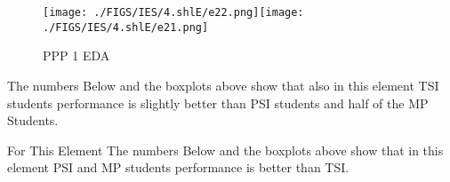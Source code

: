 \documentclass[12pt]{extreport}
\begin{document}
\begin{figure}[H]
	\centering
	\texttt{[image: ./FIGS/IES/4.shlE/e22.png]}\texttt{[image: ./FIGS/IES/4.shlE/e21.png]}
	\caption{PPP 1 EDA}
	\label{fig:45}
\end{figure}
The numbers Below and the boxplots above show that also in this element  TSI students performance is slightly better than PSI students and half of the MP Students.

For This Element The numbers Below and the boxplots above show that in this element  PSI and MP students performance is  better than TSI.


\begin{comment}

\subparagraph{Interpretation of the Box-plots:}
For This Element 

\begin{enumerate}	
	\item The MP Class Box-Plot:
	\begin{enumerate}
		\item MAX = a {} {} {} {} {} {} {} {} UQ = b {} {} {} {} {} {} {} {} Median = c
		\item LQ = d {} {} {} {} {} {} {} {}  MIN =	l {} {} {} {} {} {} {} {}  IQR = e - f = g
	\end{enumerate}
	\item The PSI Class Box-Plot:
	\begin{enumerate}
		\item MAX = a {} {} {} {} {} {} {} {} UQ = b {} {} {} {} {} {} {} {} Median = c
		\item LQ = d {} {} {} {} {} {} {} {}  MIN =	e {} {} {} {} {} {} {} {} IQR = f - g = h	
	\end{enumerate}
	\item The TSI Class Box-Plot:
	\begin{enumerate}
		\item MAX = a {} {} {} {} {} {} {} {} UQ = b {} {} {} {} {} {} {} {} Median = c
		\item LQ = d {} {} {} {} {} {} {} {} MIN = e {} {} {} {} {} {} {} {} IQR = f - g = h	
	\end{enumerate}
\end{enumerate}


\subparagraph{Interpretation of the histogram:}
This Frequency Distribution is (Skeness) with the following descriptive statistics:
\begin{enumerate}
	\item Mean = 
	\item STD = 
	\item Range = a - b = c
	\item IQR = a-b = c 
\end{enumerate}
\end{comment}
\end{document}
